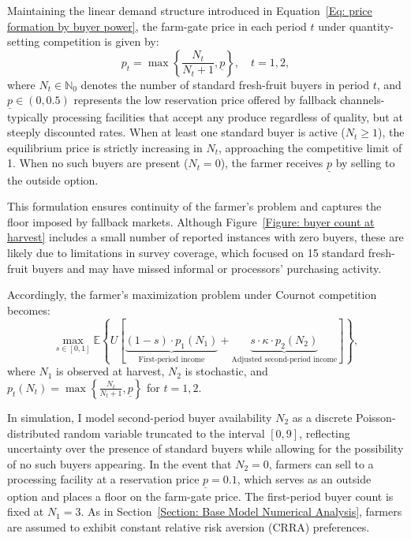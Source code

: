 Maintaining the linear demand structure introduced in Equation~\ref{Eq: price formation by buyer power}, the farm-gate price in each period $t$ under quantity-setting competition is given by:
\begin{equation}
p_t = \max\left\{\frac{N_t}{N_t + 1}, \underline{p} \right\}, \quad t = 1,2,
\end{equation}
where $N_t \in \mathbb{N}_0$ denotes the number of standard fresh-fruit buyers in period $t$, and $\underline{p} \in (0,0.5)$ represents the low reservation price offered by fallback channels-typically processing facilities that accept any produce regardless of quality, but at steeply discounted rates. When at least one standard buyer is active ($N_t \geq 1$), the equilibrium price is strictly increasing in $N_t$, approaching the competitive limit of 1. When no such buyers are present ($N_t = 0$), the farmer receives $\underline{p}$ by selling to the outside option.

This formulation ensures continuity of the farmer's problem and captures the floor imposed by fallback markets. Although Figure~\ref{Figure: buyer count at harvest} includes a small number of reported instances with zero buyers, these are likely due to limitations in survey coverage, which focused on 15 standard fresh-fruit buyers and may have missed informal or processors' purchasing activity.

Accordingly, the farmer's maximization problem under Cournot competition becomes:
\begin{equation}
\label{eq:Cournot objective function}
\max_{s \in [0,1]} \mathbb{E} \left\{ U \left[ 
\underbrace{(1-s) \cdot p_1(N_1)}_{\text{First-period income}} 
+ \underbrace{s \cdot \kappa \cdot p_2(N_2)}_{\text{Adjusted second-period income}} 
\right] \right\},
\end{equation}
where $N_1$ is observed at harvest, $N_2$ is stochastic, and 
$p_t(N_t) = \max\left\{ \tfrac{N_t}{N_t + 1}, \underline{p} \right\}$ for $t = 1,2$. 


In simulation, I model second-period buyer availability $N_2$ as a discrete Poisson-distributed random variable truncated to the interval $[0,9]$, reflecting uncertainty over the presence of standard buyers while allowing for the possibility of no such buyers appearing. In the event that $N_2 = 0$, farmers can sell to a processing facility at a reservation price $\underline{p} = 0.1$, which serves as an outside option and places a floor on the farm-gate price. The first-period buyer count is fixed at $N_1 = 3$. As in Section~\ref{Section: Base Model Numerical Analysis}, farmers are assumed to exhibit constant relative risk aversion (CRRA) preferences.

